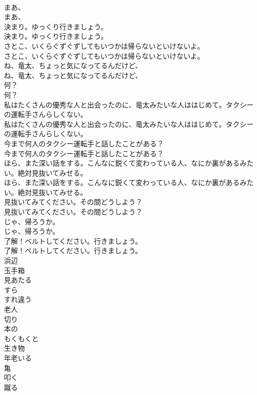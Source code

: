 \documentclass[8pt]{extreport}
\begin{document}
\begin{CJK}{UTF8}{min}
\\	まあ、	
\\	まあ、 
\\	決まり。ゆっくり行きましょう。	
\\	決まり。ゆっくり行きましょう。 
\\	さとこ、いくらぐずぐずしてもいつかは帰らないといけないよ。	
\\	さとこ、いくらぐずぐずしてもいつかは帰らないといけないよ。 
\\	ね、竜太、ちょっと気になってるんだけど、	
\\	ね、竜太、ちょっと気になってるんだけど、 
\\	何？	
\\	何？ 
\\	私はたくさんの優秀な人と出会ったのに、竜太みたいな人ははじめて。タクシーの運転手さんらしくない。	
\\	私はたくさんの優秀な人と出会ったのに、竜太みたいな人ははじめて。タクシーの運転手さんらしくない。 
\\	今まで何人のタクシー運転手と話したことがある？	
\\	今まで何人のタクシー運転手と話したことがある？ 
\\	ほら、また深い話をする。こんなに鋭くて変わっている人、なにか裏があるみたい。絶対見抜いてみせる。	
\\	ほら、また深い話をする。こんなに鋭くて変わっている人、なにか裏があるみたい。絶対見抜いてみせる。 
\\	見抜いてみてください。その間どうしよう？	
\\	見抜いてみてください。その間どうしよう？ 
\\	じゃ、帰ろうか。	
\\	じゃ、帰ろうか。 
\\	了解！ベルトしてください。行きましょう。	
\\	了解！ベルトしてください。行きましょう。 
\\	浜辺
\\	玉手箱
\\	見あたる
\\	すら
\\	すれ違う
\\	老人
\\	切り
\\	本の
\\	もくもくと
\\	生き物
\\	年老いる
\\	亀
\\	叩く
\\	蹴る

\end{CJK}
\end{document}
